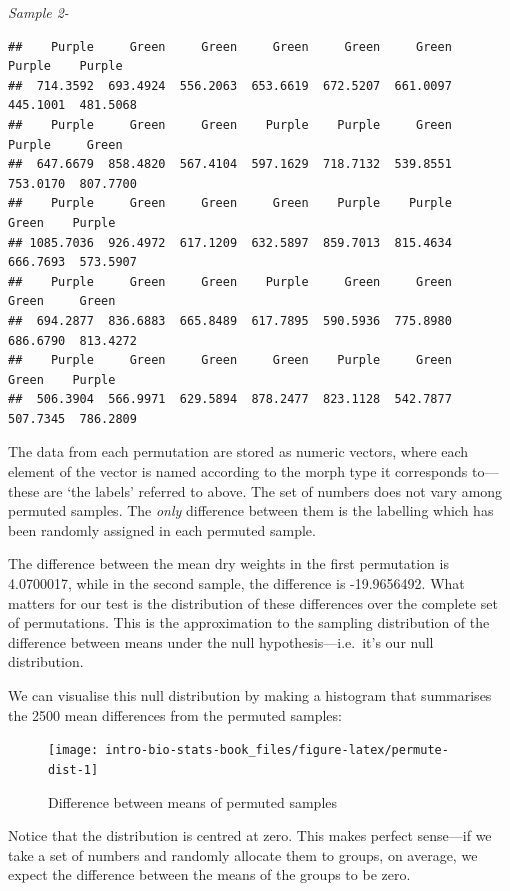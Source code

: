 \documentclass[
]{book}
\begin{document}
\emph{Sample 2-}

\begin{verbatim}
##    Purple     Green     Green     Green     Green     Green    Purple    Purple 
##  714.3592  693.4924  556.2063  653.6619  672.5207  661.0097  445.1001  481.5068 
##    Purple     Green     Green    Purple    Purple     Green    Purple     Green 
##  647.6679  858.4820  567.4104  597.1629  718.7132  539.8551  753.0170  807.7700 
##    Purple     Green     Green     Green    Purple    Purple     Green    Purple 
## 1085.7036  926.4972  617.1209  632.5897  859.7013  815.4634  666.7693  573.5907 
##    Purple     Green     Green    Purple     Green     Green     Green     Green 
##  694.2877  836.6883  665.8489  617.7895  590.5936  775.8980  686.6790  813.4272 
##    Purple     Green     Green     Green    Purple     Green     Green    Purple 
##  506.3904  566.9971  629.5894  878.2477  823.1128  542.7877  507.7345  786.2809
\end{verbatim}

The data from each permutation are stored as numeric vectors, where each element of the vector is named according to the morph type it corresponds to---these are `the labels' referred to above. The set of numbers does not vary among permuted samples. The \emph{only} difference between them is the labelling which has been randomly assigned in each permuted sample.

The difference between the mean dry weights in the first permutation is 4.0700017, while in the second sample, the difference is -19.9656492. What matters for our test is the distribution of these differences over the complete set of permutations. This is the approximation to the sampling distribution of the difference between means under the null hypothesis---i.e.~it's our null distribution.

We can visualise this null distribution by making a histogram that summarises the 2500 mean differences from the permuted samples:

\begin{figure}

{\centering \texttt{[image: intro-bio-stats-book\_files/figure-latex/permute-dist-1]} 

}

\caption{Difference between means of permuted samples}\label{fig:permute-dist}
\end{figure}

Notice that the distribution is centred at zero. This makes perfect sense---if we take a set of numbers and randomly allocate them to groups, on average, we expect the difference between the means of the groups to be zero.
\end{document}
